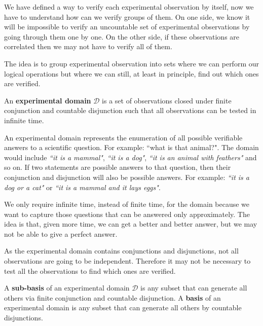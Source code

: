 \documentclass[11pt,letterpaper,fleqn]{memoir} %
\begin{document}
We have defined a way to verify each experimental observation by itself, now we have to understand how can we verify groups of them. On one side, we know it will be impossible to verify an uncountable set of experimental observations by going through them one by one. On the other side, if these observations are correlated then we may not have to verify all of them.

The idea is to group experimental observation into sets where we can perform our logical operations but where we can still, at least in principle, find out which ones are verified.

\begin{mathSection}
\begin{defn}
	An \textbf{experimental domain} $\mathcal{D}$ is a set of observations closed under finite conjunction and countable disjunction such that all observations can be tested in infinite time. 
\end{defn}
\end{mathSection}

An experimental domain represents the enumeration of all possible verifiable answers to a scientific question. For example: ``what is that animal?". The domain would include \emph{``it is a mammal"}, \emph{``it is a dog"}, \emph{``it is an animal with feathers"} and so on. If two statements are possible answers to that question, then their conjunction and disjunction will also be possible answers. For example: \emph{``it is a dog or a cat"} or \emph{``it is a mammal and it lays eggs"}.

We only require infinite time, instead of finite time, for the domain because we want to capture those questions that can be answered only approximately. The idea is that, given more time, we can get a better and better answer, but we may not be able to give a perfect answer.

As the experimental domain contains conjunctions and disjunctions, not all observations are going to be independent. Therefore it may not be necessary to test all the observations to find which ones are verified.

\begin{mathSection}
\begin{defn}
	A \textbf{sub-basis} of an experimental domain $\mathcal{D}$ is any subset that can generate all others via finite conjunction and countable disjunction. A \textbf{basis} of an experimental domain is any subset that can generate all others by countable disjunctions. 
\end{defn}
\end{mathSection}
\end{document}
